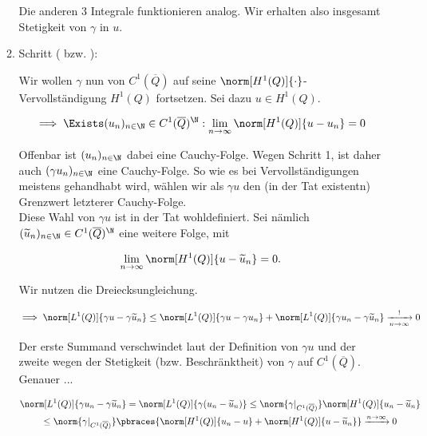 \begin{solution}
\begin{enumerate}[label = \textbf{\alph*)}]
\begin{enumerate}[label = \arabic*.]
    Die anderen $3$ Integrale funktionieren analog.
    Wir erhalten also insgesamt Stetigkeit von $\gamma$ in $u$.

    \item Schritt ( bzw. ):

    Wir wollen $\gamma$ nun von $C^1(\overline{Q})$ auf seine $\norm[H^1(Q)]{\cdot}$-Vervollständigung $H^1(Q)$ fortsetzen.
    Sei dazu $u \in H^1(Q)$.

    \begin{align*}
      \implies
      \Exists (u_n)_{n \in \N} \in C^1(\overline{Q})^\N:
      \lim_{n \to \infty}
      \norm[H^1(Q)]{u - u_n}
      =
      0
    \end{align*}

    Offenbar ist $(u_n)_{n \in \N}$ dabei eine Cauchy-Folge.
    Wegen Schritt 1, ist daher auch $(\gamma u_n)_{n \in \N}$ eine Cauchy-Folge.
    So wie es bei Vervollständigungen meistens gehandhabt wird, wählen wir als $\gamma u$ den (in der Tat existentn) Grenzwert letzterer Cauchy-Folge. \\

    Diese Wahl von $\gamma u$ ist in der Tat wohldefiniert.
    Sei nämlich $(\widetilde{u}_n)_{n \in \N} \in C^1(\overline{Q})^\N$ eine weitere Folge, mit

    \begin{align*}
      \lim_{n \to \infty}
      \norm[H^1(Q)]{u - \widetilde{u}_n}
      =
      0.
    \end{align*}

    Wir nutzen die Dreiecksungleichung.

    \begin{align*}
      \implies
      \norm[L^1(Q)]{\gamma u - \gamma \widetilde{u}_n}
      \leq
      \norm[L^1(Q)]{\gamma u - \gamma u_n}
      +
      \norm[L^1(Q)]{\gamma u_n - \gamma \widetilde{u}_n}
      \xrightarrow[n \to \infty]{!}
      0
    \end{align*}

    Der erste Summand verschwindet laut der Definition von $\gamma u$ und der zweite wegen der Stetigkeit (bzw. Beschränktheit) von $\gamma$ auf $C^1(\overline{Q})$.
    Genauer ...

    \begin{multline*}
      \norm[L^1(Q)]{\gamma u_n - \gamma \widetilde{u}_n}
      =
      \norm[L^1(Q)]{\gamma (u_n - \widetilde{u}_n)}
      \leq
      \norm{\gamma|_{C^1(\overline{Q})}}
      \norm[H^1(Q)]{u_n - \widetilde{u}_n} \\
      \leq
      \norm{\gamma|_{C^1(\overline{Q})}}
      \pbraces
      {
        \norm[H^1(Q)]{u_n - u}
        +
        \norm[H^1(Q)]{u - \widetilde{u}_n}
      }
      \xrightarrow[]{n \to \infty}
      0
    \end{multline*}


\end{enumerate}
\end{enumerate}
\end{solution}
